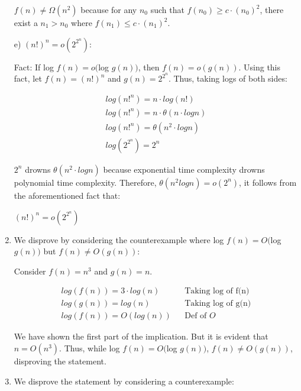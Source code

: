 \documentclass[a4paper]{report}
\begin{document}
\begin{enumerate}
      $f(n) \neq \Omega(n^2)$ because for any $n_{0}$ such that $f(n_{0}) \geq c \cdot (n_{0})^2$, 
      there exist a $n_{1} > n_{0}$ where $f(n_{1}) \leq c \cdot (n_{1})^2$. 


      \bigskip
      e) 
      $(n!)^{n} = o(2^{2^{n}})$:

      Fact: If log $f(n) = o($log $g(n))$, then $f(n) = o(g(n))$. 
      Using this fact, let $f(n) = (n!)^{n}$ and $g(n) = 2^{2^{n}}$. Thus, taking logs of both sides:

      \begin{align}
        log(n!^{n}) = n \cdot log(n!)\\
        log(n!^{n}) = n \cdot \theta(n \cdot log n)\\
        log(n!^{n}) = \theta(n^2 \cdot log n)\\
        log(2^{2^{n}}) = 2^n 
      \end{align}

      $2^n$ drowns $\theta(n^2 \cdot log n)$ because exponential time complexity drowns polynomial
      time complexity.
      Therefore, $\theta(n^2 log n) = o(2^{n})$, it follows from the aforementioned fact that:

      $(n!)^{n} = o(2^{2^{n}})$

    \pagebreak
    \bigskip
    \setcounter{equation}{0}
    \item We disprove by considering the counterexample where log $f(n) = O($log $g(n))$ but $f(n) \neq O(g(n))$: 
    
      Consider $f(n) = n^3$ and $g(n) = n$. 

      \begin{align}
        log(f(n)) = 3 \cdot log(n)                    &&\text{Taking log of f(n)}\\
        log(g(n)) = log(n)                            &&\text{Taking log of g(n)}\\
        log(f(n)) = O(log(n))                         &&\text{Def of $O$}
      \end{align}

      We have shown the first part of the implication. But it is evident that $n = O(n^3)$.
      Thus, while log $f(n) = O($log $g(n))$, $f(n) \neq O(g(n))$, disproving the statement.

    \bigskip
    \setcounter{equation}{0}
    \item We disprove the statement by considering a counterexample: 


\end{enumerate}
\end{document}
